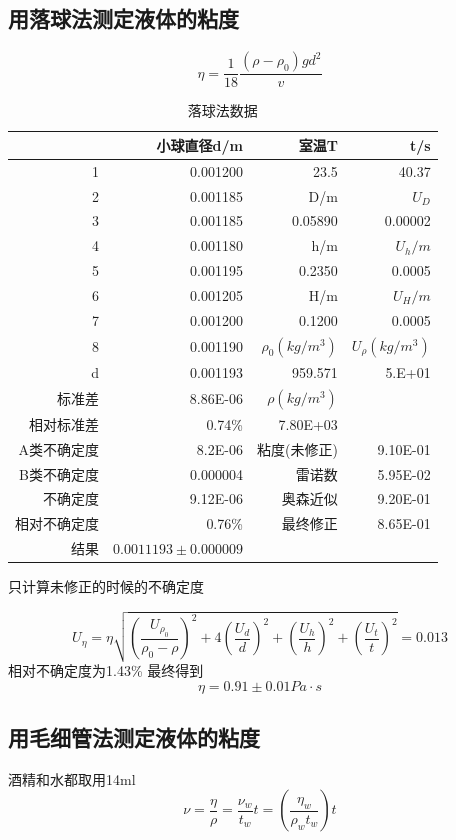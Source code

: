\documentclass[12pt,a4paper]{ctexart}
\begin{document}
\subsection{用落球法测定液体的粘度}
$$\eta=\frac{1}{18}\frac{(\rho-\rho_0)gd^2}{v}$$

\begin{table}[htbp]
  \centering
  \caption{落球法数据}
    \begin{tabular}{|r|r|r|r|}
    \toprule
          & 小球直径d/m & 室温T   &  t/s \\
          \midrule
    1     & 0.001200 & 23.5  & 40.37 \\
    2     & 0.001185 & D/m   & $U_D$ \\
    3     & 0.001185 & 0.05890 & 0.00002 \\
    4     & 0.001180 & h/m   & $U_h/m$ \\
    5     & 0.001195 & 0.2350 & 0.0005 \\
    6     & 0.001205 & H/m   & $U_H/m$ \\
    7     & 0.001200 & 0.1200 & 0.0005 \\
    8     & 0.001190 & $\rho_0(kg/m^3)$ & $U_{\rho}(kg/m^3)$ \\
    d     & 0.001193 & 959.571 & 5.E+01 \\
    标准差   & 8.86E-06 & $\rho(kg/m^3)$ &  \\
    相对标准差 & 0.74\% & 7.80E+03 &  \\
    A类不确定度 & 8.2E-06 & 粘度(未修正) & 9.10E-01 \\
    B类不确定度 & 0.000004 & 雷诺数   & 5.95E-02 \\
    不确定度  & 9.12E-06 & 奥森近似  & 9.20E-01 \\
    相对不确定度 & 0.76\% & 最终修正  & 8.65E-01 \\
    结果    & $0.0011193\pm 0.000009 $&       &  \\
    \bottomrule
    \end{tabular}%
  \label{tab:addlabel}%
\end{table}%

只计算未修正的时候的不确定度

$$U_{\eta}=\eta\sqrt{\left(\frac{U_{\rho_0}}{\rho_0-\rho}\right)^2+4\left(\frac{U_d}{d}\right)^2+\left(\frac{U_h}{h}\right)^2+\left(\frac{U_t}{t}\right)^2}=0.013$$
相对不确定度为1.43\%
最终得到
$$\eta=0.91\pm0.01 Pa\cdot s$$
\subsection{用毛细管法测定液体的粘度}
酒精和水都取用14ml
$$\nu=\frac{\eta}{\rho}=\frac{\nu_w}{t_w}t=(\frac{\eta_w}{\rho_wt_w})t$$
\end{document}
